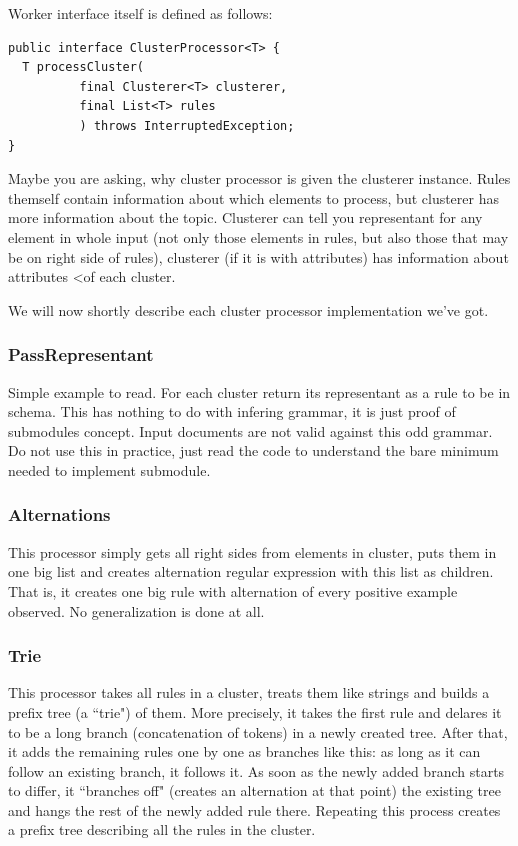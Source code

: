 \documentclass[a4paper,10pt,oneside]{article}
\begin{document}
Worker interface itself is defined as follows:
\begin{verbatim}
public interface ClusterProcessor<T> {
  T processCluster(
          final Clusterer<T> clusterer,
          final List<T> rules
          ) throws InterruptedException;
}
\end{verbatim}
Maybe you are asking, why cluster processor is given the clusterer instance.
Rules themself contain information about which elements to process, but clusterer has more information
about the topic.
Clusterer can tell you representant for any element in whole input (not only those elements in rules, but also those that may be on right side of rules), clusterer (if it is with attributes) has information about attributes <of each cluster.

We will now shortly describe each cluster processor implementation we've got.

\subsubsection{PassRepresentant}
Simple example to read. For each cluster return its representant as a rule to be in schema.
This has nothing to do with infering grammar, it is just proof of submodules concept.
Input documents are not valid against this odd grammar.
Do not use this in practice, just read the code to understand the bare minimum needed to implement submodule.

\subsubsection{Alternations}
This processor simply gets all right sides from elements in cluster, puts them in one big list and creates alternation regular expression with this list as children.
That is, it creates one big rule with alternation of every positive example observed.
No generalization is done at all.

\subsubsection{Trie}
This processor takes all rules in a cluster, treats them like strings and builds a prefix tree (a ``trie") of them. More precisely, it takes the first rule and delares it to be a long branch (concatenation of tokens) in a newly created tree. After that, it adds the remaining rules one by one as branches like this: as long as it can follow an existing branch, it follows it. As soon as the newly added branch starts to differ, it ``branches off" (creates an alternation at that point) the existing tree and hangs the rest of the newly added rule there. Repeating this process creates a prefix tree describing all the rules in the cluster.
\end{document}
